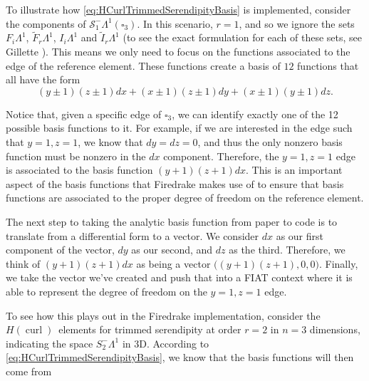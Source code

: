 \documentclass[format=acmsmall,screen,timestamp=false,a4paper]{acmart}
\DeclareMathOperator{\curl}{curl}
\newcommand\josh[1]{\textbf{\textcolor[rgb]{0,.5,1}{[Josh: #1]}}}
\newcommand{\calS}{\mathcal{S}}
\newcommand{\hcurl}{\ensuremath{{H}(\curl)}\xspace}
\begin{document}
  \begin{example}\label{ex:UsingComputationalBasis}
  To illustrate how \cref{eq:HCurlTrimmedSerendipityBasis} is implemented, consider the components of $\calS_1^-\Lambda^1(\square_3)$.  In this scenario, $r=1$, and so we ignore the sets $F_i\Lambda^1$, $\tilde{F}_r\Lambda^1$, $I_i \Lambda^1$ and $\tilde{I}_r\Lambda^1$ (to see the exact formulation for each of these sets, see Gillette \cite{gillette2019computational}).  This means we only need to focus on the functions associated to the edge of the reference element.  These functions create a basis of $12$ functions that all have the form 
  \begin{equation*}
      (y\pm 1)(z\pm 1)dx + (x\pm 1)(z\pm 1) dy + (x \pm 1)(y \pm 1)dz.
  \end{equation*}
  
  Notice that, given a specific edge of $\square_3$, we can identify exactly one of the 12 possible basis functions to it.  For example, if we are interested in the edge such that $y=1, z=1$, we know that $dy = dz = 0$, and thus the only nonzero basis function must be nonzero in the $dx$ component. Therefore, the $y=1, z=1$ edge is associated to the basis function $(y+1)(z+1)dx$.  This is an important aspect of the basis functions that Firedrake makes use of to ensure that basis functions are associated to the proper degree of freedom on the reference element.
  
  The next step to taking the analytic basis function from paper to code is to translate from a differential form to a vector.  We consider $dx$ as our first component of the vector, $dy$ as our second, and $dz$ as the third.  Therefore, we  think of $(y+1)(z+1)dx$ as being a vector $\big((y+1)(z+1), 0, 0\big)$.  Finally, we take the vector we've created and push that into a FIAT context where it is able to represent the degree of freedom on the $y=1, z=1$ edge.
  \end{example}
 
To see how this plays out in the Firedrake implementation, consider the \hcurl~elements for trimmed serendipity at order $r=2$ in $n=3$ dimensions, indicating the space $S_2^- \Lambda^1$ in 3D. According to \cref{eq:HCurlTrimmedSerendipityBasis}, we know that the basis functions will then come from
\end{document}
